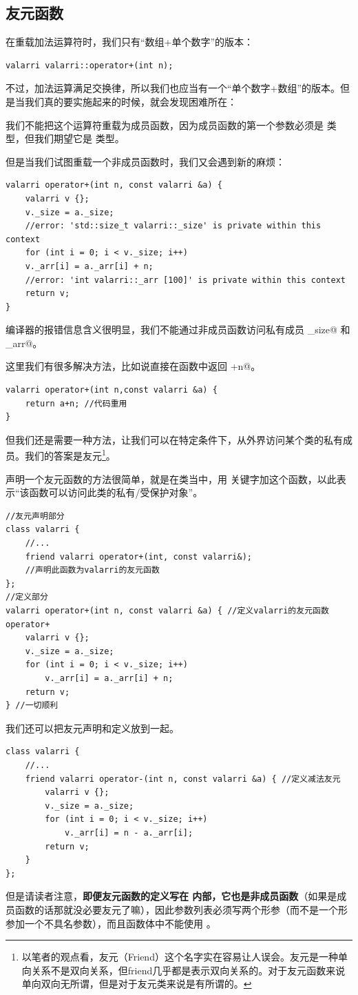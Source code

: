 \subsection*{友元函数}
在重载加法运算符时，我们只有``数组+单个数字''的版本：
\begin{lstlisting}
valarri valarri::operator+(int n);
\end{lstlisting}
不过，加法运算满足交换律，所以我们也应当有一个``单个数字+数组''的版本。但是当我们真的要实施起来的时候，就会发现困难所在：\par
我们不能把这个运算符重载为成员函数，因为成员函数的第一个参数必须是 \lstinline@valarri@ 类型，但我们期望它是 \lstinline@int@ 类型。\par
但是当我们试图重载一个非成员函数时，我们又会遇到新的麻烦：
\begin{lstlisting}
valarri operator+(int n, const valarri &a) {
    valarri v {};
    v._size = a._size;
    //error: 'std::size_t valarri::_size' is private within this context
    for (int i = 0; i < v._size; i++)
    v._arr[i] = a._arr[i] + n;
    //error: 'int valarri::_arr [100]' is private within this context
    return v;
}
\end{lstlisting}
编译器的报错信息含义很明显，我们不能通过非成员函数访问私有成员 \lstinline@_size@ 和 \lstinline@_arr@。\par
这里我们有很多解决方法，比如说直接在函数中返回 \lstinline@a+n@。
\begin{lstlisting}
valarri operator+(int n,const valarri &a) {
    return a+n; //代码重用
}
\end{lstlisting}\par
但我们还是需要一种方法，让我们可以在特定条件下，从外界访问某个类的私有成员。我们的答案是友元\footnote{以笔者的观点看，友元（Friend）这个名字实在容易让人误会。友元是一种单向关系不是双向关系，但friend几乎都是表示双向关系的。对于友元函数来说单向双向无所谓，但是对于友元类来说是有所谓的。}。\par
声明一个友元函数的方法很简单，就是在类当中，用 \lstinline@friend@ 关键字加这个函数，以此表示``该函数可以访问此类的私有/受保护对象''。
\begin{lstlisting}
//友元声明部分
class valarri {
    //...
    friend valarri operator+(int, const valarri&);
    //声明此函数为valarri的友元函数
};
//定义部分
valarri operator+(int n, const valarri &a) { //定义valarri的友元函数operator+
    valarri v {};
    v._size = a._size;
    for (int i = 0; i < v._size; i++)
        v._arr[i] = a._arr[i] + n;
    return v;
} //一切顺利
\end{lstlisting}\par
我们还可以把友元声明和定义放到一起。
\begin{lstlisting}
class valarri {
    //...
    friend valarri operator-(int n, const valarri &a) { //定义减法友元
        valarri v {};
        v._size = a._size;
        for (int i = 0; i < v._size; i++)
            v._arr[i] = n - a._arr[i];
        return v;
    }
};
\end{lstlisting}
但是请读者注意，\textbf{即便友元函数的定义写在 \lstinline@class@ 内部，它也是非成员函数}（如果是成员函数的话那就没必要友元了嘛），因此参数列表必须写两个形参（而不是一个形参加一个不具名参数），而且函数体中不能使用 \lstinline@this@。\par
